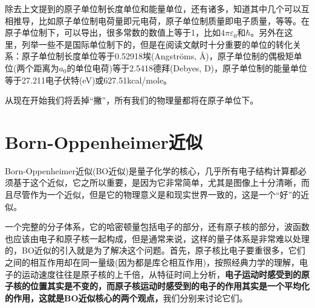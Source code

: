 \documentclass[12pt,a4paper,openany,twoside]{book}
\numberwithin{equation}{section}
\begin{document}
        除去上文提到的原子单位制长度单位和能量单位，还有诸多，知道其中几个可以互相推导，比如原子单位制电荷量即元电荷，原子单位制质量即电子质量，等等。在原子单位制下，可以导出，很多常数的数值上等于1，比如$ 4 \pi \varepsilon_0$和$\hbar$。另外在这里，列举一些不是国际单位制下的，但是在阅读文献时十分重要的单位的转化关系：原子单位制长度单位等于0.52918埃(Angstr\"oms, \AA)，原子单位制的偶极矩单位(两个距离为$a_0$的单位电荷)等于2.5418德拜(Debyes, D)，原子单位制的能量单位等于27.211电子伏特(eV)或627.51kcal/mole。

        从现在开始我们将丢掉“撇”，所有我们的物理量都将在原子单位下。

      \section{Born-Oppenheimer近似}
        Born-Oppenheimer近似(BO近似)是量子化学的核心，几乎所有电子结构计算都必须基于这个近似，它之所以重要，是因为它非常简单，尤其是图像上十分清晰，而且尽管作为一个近似，但是它的物理意义是和现实世界一致的，这是一个“好”的近似。

        一个完整的分子体系，它的哈密顿量包括电子的部分，还有原子核的部分，波函数也应该由电子和原子核一起构成，但是通常来说，这样的量子体系是非常难以处理的，BO近似的引入就是为了解决这个问题。首先，原子核比电子要重很多，它们之间的相互作用却在同一量级(因为都是库仑相互作用)，按照经典力学的理解，电子的运动速度往往是原子核的上千倍，从特征时间上分析，\textbf{电子运动时感受到的原子核的位置其实是不变的，而原子核运动时感受到的电子的作用其实是一个平均化的作用，这就是BO近似核心的两个观点，}我们分别来讨论它们。
\end{document}
